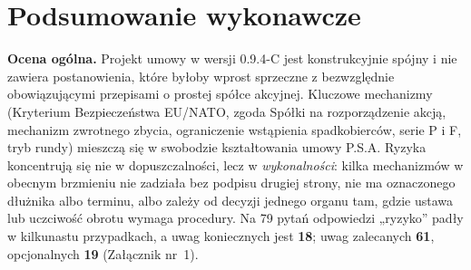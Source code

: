 \documentclass[12pt,a4paper]{report}
\begin{document}
\clearpage
\chapter*{Podsumowanie wykonawcze}

\textbf{Ocena ogólna.} Projekt umowy w wersji 0.9.4-C jest konstrukcyjnie spójny i nie zawiera postanowienia, które byłoby wprost sprzeczne z bezwzględnie obowiązującymi przepisami o prostej spółce akcyjnej. Kluczowe mechanizmy (Kryterium Bezpieczeństwa EU/NATO, zgoda Spółki na rozporządzenie akcją, mechanizm zwrotnego zbycia, ograniczenie wstąpienia spadkobierców, serie P i F, tryb rundy) mieszczą się w swobodzie kształtowania umowy P.S.A. Ryzyka koncentrują się nie w dopuszczalności, lecz w \emph{wykonalności}: kilka mechanizmów w obecnym brzmieniu nie zadziała bez podpisu drugiej strony, nie ma oznaczonego dłużnika albo terminu, albo zależy od decyzji jednego organu tam, gdzie ustawa lub uczciwość obrotu wymaga procedury. Na 79 pytań odpowiedzi „ryzyko” padły w kilkunastu przypadkach, a uwag koniecznych jest \textbf{18}; uwag zalecanych \textbf{61}, opcjonalnych \textbf{19} (Załącznik nr~1).
\end{document}
